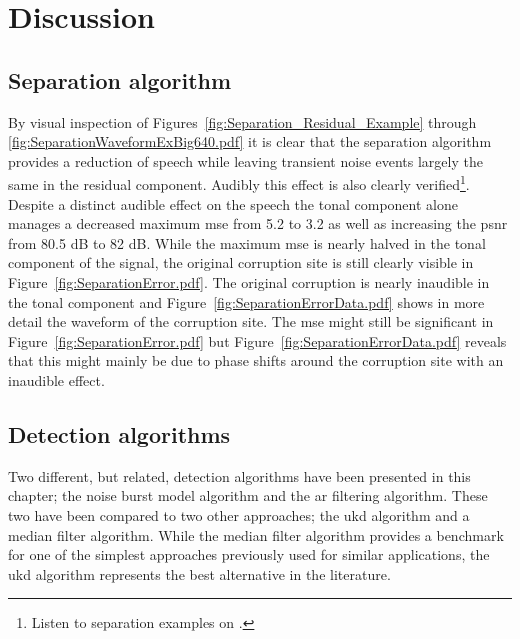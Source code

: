 \section{Discussion}\label{sec:WPdiscussion}
\subsection{Separation algorithm}

By visual inspection of Figures~\ref{fig:Separation_Residual_Example} through \ref{fig:SeparationWaveformExBig640.pdf} it is clear that the separation algorithm provides a reduction of speech while leaving transient noise events largely the same in the residual component. Audibly this effect is also clearly verified\footnote{Listen to separation examples on \siteURL.}. Despite a distinct audible effect on the speech the tonal component alone manages a decreased maximum \gls{mse} from 5.2 to 3.2 as well as increasing the \gls{psnr} from 80.5 dB to 82 dB. While the maximum \gls{mse} is nearly halved in the tonal component of the signal, the original corruption site is still clearly visible in Figure~\ref{fig:SeparationError.pdf}. The original corruption is nearly inaudible in the tonal component and Figure~\ref{fig:SeparationErrorData.pdf} shows in more detail the waveform of the corruption site. The \gls{mse} might still be significant in Figure~\ref{fig:SeparationError.pdf} but Figure~\ref{fig:SeparationErrorData.pdf} reveals that this might mainly be due to phase shifts around the corruption site with an inaudible effect.

\subsection{Detection algorithms}
Two different, but related, detection algorithms have been presented in this chapter; the noise burst model algorithm and the \gls{ar} filtering algorithm. These two have been compared to two other approaches; the \gls{ukd} algorithm \cite{Subramanya2007} and a median filter algorithm. While the median filter algorithm provides a benchmark for one of the simplest approaches previously used for similar applications, the \gls{ukd} algorithm represents the best alternative in the literature.

